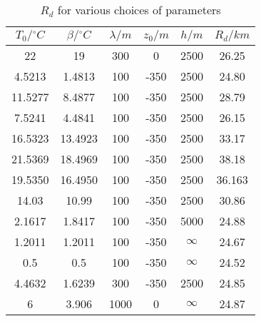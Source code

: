 \documentclass[10pt]{article}
\begin{document}
\begin{table}[H]        
	\centering
		\begin{tabular}{|c|c|c|c|c|c|}
			\hline
				    $T_{0}/{}^{\circ}C$	 	& 		$\beta/{}^{\circ}C$	 & $ \lambda/m$	& $z_{0}/m$ & $h/m$ & $R_{d}/km$ \\
			\hline
				   	22 & 19 & 300 & 0 & 2500 & 26.25  \\	
				   	4.5213 & 1.4813 & 100 & -350 & 2500 & 24.80  \\		
				   	11.5277 & 8.4877 & 100 & -350 & 2500 & 28.79  \\
				   	7.5241	&	4.4841 & 100 & -350 & 2500 & 26.15 \\
				   	16.5323 & 13.4923 & 100 & -350 & 2500 & 33.17 \\
				   	21.5369 & 18.4969 & 100 & -350 & 2500 & 38.18 \\
				   	19.5350 & 16.4950 & 100 & -350 & 2500 & 36.163 \\
				   	14.03      & 10.99 & 100 & -350 & 2500 & 30.86 \\
				   	2.1617 	  & 1.8417 & 100 & -350 & 5000 & 24.88 \\
				   	1.2011 & 1.2011 & 100 & -350 & $\infty$ & 24.67 \\
				   	0.5 & 0.5 & 100 & -350 & $\infty$ & 24.52 \\
				   	4.4632 & 1.6239 & 300 & -350 & 2500 & 24.85  \\
				   	6 	& 3.906 & 1000 & 0 & $\infty$ & 24.87 \\
             \hline
		\end{tabular}
		\caption{$R_{d}$ for various choices of parameters}
		           	\label{table:profiles}
\end{table}
\end{document}
